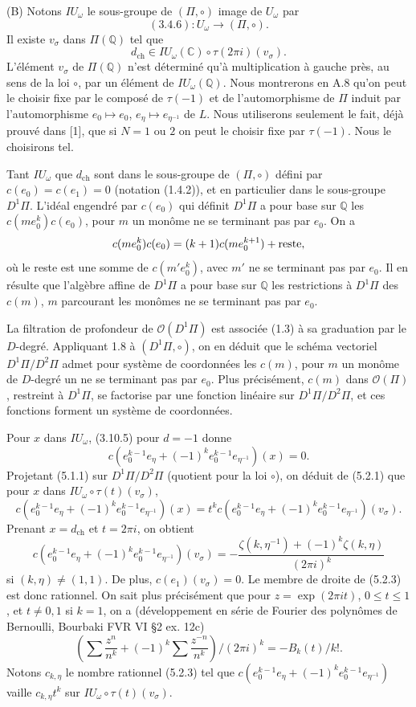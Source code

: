 \documentclass[10pt,a4paper]{article}
\newcommand{\Q}{\mathbb Q}
\newcommand{\OO}{\mathcal O}
\newcommand{\C}{\mathbb C}
\theoremstyle{deligne}
\newcommand{\heading}[1]{\vspace{0.65em}\noindent{\bfseries #1}\quad}
\begin{document}
(B) Notons \(IU_\omega\) le sous-groupe de \((\Pi,\circ)\) image de \(U_\omega\) par
\[
(3.4.6):U_\omega\longrightarrow(\Pi,\circ).
\]
Il existe \(v_\sigma\) dans \(\Pi(\Q)\) tel que
\[
\tag{5.1.1}
d_{\mathrm{ch}}\in IU_\omega(\C)\circ \tau(2\pi i)(v_\sigma).
\]
L'élément \(v_\sigma\) de \(\Pi(\Q)\) n'est déterminé qu'à multiplication à gauche près, au sens de la loi \(\circ\), par un élément de \(IU_\omega(\Q)\). Nous montrerons en A.8 qu'on peut le choisir fixe par le composé de \(\tau(-1)\) et de l'automorphisme de \(\Pi\) induit par l'automorphisme \(e_0\mapsto e_0\), \(e_\eta\mapsto e_{\eta^{-1}}\) de \(L\). Nous utiliserons seulement le fait, déjà prouvé dans [1], que si \(N=1\) ou \(2\) on peut le choisir fixe par \(\tau(-1)\). Nous le choisirons tel.

\heading{5.2.} Tant \(IU_\omega\) que \(d_{\mathrm{ch}}\) sont dans le sous-groupe de \((\Pi,\circ)\) défini par \(c(e_0)=c(e_1)=0\) (notation (1.4.2)), et en particulier dans le sous-groupe \(D^1\Pi\). L'idéal engendré par \(c(e_0)\) qui définit \(D^1\Pi\) a pour base sur \(\Q\) les \(c(me_0^k)c(e_0)\), pour \(m\) un monôme ne se terminant pas par \(e_0\). On a
\[
c(me_0^k)c(e_0)=(k+1)c(me_0^{k+1})+\hbox{reste},
\]
où le reste est une somme de \(c(m'e_0^k)\), avec \(m'\) ne se terminant pas par \(e_0\). Il en résulte que l'algèbre affine de \(D^1\Pi\) a pour base sur \(\Q\) les restrictions à \(D^1\Pi\) des \(c(m)\), \(m\) parcourant les monômes ne se terminant pas par \(e_0\).

La filtration de profondeur de \(\OO(D^1\Pi)\) est associée (1.3) à sa graduation par le \(D\)-degré. Appliquant 1.8 à \((D^1\Pi,\circ)\), on en déduit que le schéma vectoriel \(D^1\Pi/D^2\Pi\) admet pour système de coordonnées les \(c(m)\), pour \(m\) un monôme de \(D\)-degré un ne se terminant pas par \(e_0\). Plus précisément, \(c(m)\) dans \(\OO(\Pi)\), restreint à \(D^1\Pi\), se factorise par une fonction linéaire sur \(D^1\Pi/D^2\Pi\), et ces fonctions forment un système de coordonnées.

Pour \(x\) dans \(IU_\omega\), (3.10.5) pour \(d=-1\) donne
\[
\tag{5.2.1}
c(e_0^{k-1}e_\eta+(-1)^ke_0^{k-1}e_{\eta^{-1}})(x)=0.
\]
Projetant (5.1.1) sur \(D^1\Pi/D^2\Pi\) (quotient pour la loi \(\circ\)), on déduit de (5.2.1) que pour \(x\) dans \(IU_\omega\circ\tau(t)(v_\sigma)\),
\[
\tag{5.2.2}
c(e_0^{k-1}e_\eta+(-1)^ke_0^{k-1}e_{\eta^{-1}})(x)
=t^k c(e_0^{k-1}e_\eta+(-1)^ke_0^{k-1}e_{\eta^{-1}})(v_\sigma).
\]
Prenant \(x=d_{\mathrm{ch}}\) et \(t=2\pi i\), on obtient
\[
\tag{5.2.3}
c(e_0^{k-1}e_\eta+(-1)^ke_0^{k-1}e_{\eta^{-1}})(v_\sigma)
=-\frac{\zeta(k,\eta^{-1})+(-1)^k\zeta(k,\eta)}{(2\pi i)^k}
\]
si \((k,\eta)\ne(1,1)\). De plus, \(c(e_1)(v_\sigma)=0\). Le membre de droite de (5.2.3) est donc rationnel. On sait plus précisément que pour \(z=\exp(2\pi it)\), \(0\le t\le1\), et \(t\ne0,1\) si \(k=1\), on a (développement en série de Fourier des polynômes de Bernoulli, Bourbaki FVR VI \S2 ex. 12c)
\[
\tag{5.2.4}
\left(\sum\frac{z^n}{n^k}+(-1)^k\sum\frac{z^{-n}}{n^k}\right)/(2\pi i)^k=-B_k(t)/k!.
\]
Notons \(c_{k,\eta}\) le nombre rationnel (5.2.3) tel que \(c(e_0^{k-1}e_\eta+(-1)^ke_0^{k-1}e_{\eta^{-1}})\) vaille \(c_{k,\eta}t^k\) sur \(IU_\omega\circ\tau(t)(v_\sigma)\).
\end{document}
